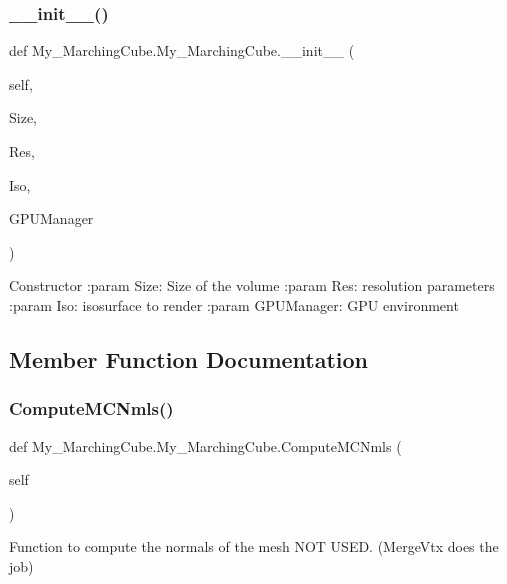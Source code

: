 \subsubsection{\texorpdfstring{\+\_\+\+\_\+init\+\_\+\+\_\+()}{\_\_init\_\_()}}
{\footnotesize\ttfamily def My\+\_\+\+Marching\+Cube.\+My\+\_\+\+Marching\+Cube.\+\_\+\+\_\+init\+\_\+\+\_\+ (\begin{DoxyParamCaption}\item[{}]{self,  }\item[{}]{Size,  }\item[{}]{Res,  }\item[{}]{Iso,  }\item[{}]{G\+P\+U\+Manager }\end{DoxyParamCaption})}

\begin{DoxyVerb}Constructor
:param Size: Size of the volume
:param Res: resolution parameters
:param Iso: isosurface to render
:param GPUManager: GPU environment
\end{DoxyVerb}
 

\subsection{Member Function Documentation}
\mbox{\label{class_my___marching_cube_1_1_my___marching_cube_a5a1e9c085022497596ba726002435603}} 
\subsubsection{\texorpdfstring{Compute\+M\+C\+Nmls()}{ComputeMCNmls()}}
{\footnotesize\ttfamily def My\+\_\+\+Marching\+Cube.\+My\+\_\+\+Marching\+Cube.\+Compute\+M\+C\+Nmls (\begin{DoxyParamCaption}\item[{}]{self }\end{DoxyParamCaption})}

\begin{DoxyVerb}    Function to compute the normals of the mesh
    NOT USED. (MergeVtx does the job)
\end{DoxyVerb}
 \mbox{\label{class_my___marching_cube_1_1_my___marching_cube_a27d160262d57b10e11ec11978c4fa8ea}} 
